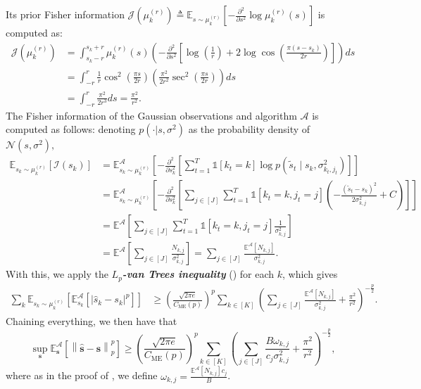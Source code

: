 \documentclass{article}
\def\vs{{\bm{s}}}
\def\gA{{\mathcal{A}}}
\def\gI{{\mathcal{I}}}
\def\gJ{{\mathcal{J}}}
\def\gN{{\mathcal{N}}}
\newcommand{\E}{\mathbb{E}}
\theoremstyle{plain}
\theoremstyle{definition}
\theoremstyle{plain}
\newcommand{\bignorm}[1]{\left\lVert #1 \right\rVert}
\newcommand{\indicator}{\mathds{1}}
\begin{document}
Its prior Fisher information $\gJ(\mu_k^{(r)}) \triangleq \E_{s \sim \mu_k^{(r)}}\left[ -\frac{\partial^2}{\partial s^2} \log \mu_k^{(r)}(s) \right]$ is computed as:
\begin{align}
    \gJ(\mu_k^{(r)}) &= \int_{s_k-r}^{s_k+r} \mu_k^{(r)}(s) \left( -\frac{\partial^2}{\partial s^2} \left[ \log\left(\frac{1}{r}\right) + 2 \log \cos\left(\frac{\pi (s - s_k)}{2r}\right) \right] \right) ds \\
    &= \int_{-r}^{r} \frac{1}{r} \cos^2\left(\frac{\pi s}{2 r}\right) \left( \frac{\pi^2}{2 r^2} \sec^2\left(\frac{\pi s}{2 r}\right) \right) ds \\
    &= \int_{-r}^{r} \frac{\pi^2}{2 r^3} ds = \frac{\pi^2}{r^2}.
\end{align}
The Fisher information of the Gaussian observations and algorithm $\gA$ is computed as follows: denoting $p(\cdot | s, \sigma^2)$ as the probability density of $\gN(s, \sigma^2),$
\begin{align}
    \E_{s_k \sim \mu_k^{(r)}}\left[ \gI(s_k) \right] &= \E_{s_k \sim \mu_k^{(r)}}^\gA \left[ -\frac{\partial^2}{\partial s_k^2} \left[ \sum_{t=1}^T \indicator[k_t = k] \log p(\tilde{s}_t \mid s_k, \sigma_{k_t,j_t}^2) \right] \right] \\
    &= \E_{s_k \sim \mu_k^{(r)}}^\gA \left[ -\frac{\partial^2}{\partial s_k^2} \left[ \sum_{j \in [J]} \sum_{t=1}^T \indicator[k_t = k, j_t = j] \left( -\frac{(\tilde{s}_t - s_k)^2}{2\sigma_{k,j}^2} + C \right) \right] \right] \\
    &= \E^\gA \left[ \sum_{j \in [J]} \sum_{t=1}^T \indicator[k_t = k, j_t = j] \frac{1}{\sigma_{k,j}^2} \right] \\
    &= \E^\gA \left[ \sum_{j \in [J]} \frac{N_{k,j}}{\sigma_{k,j}^2} \right]
    = \sum_{j \in [J]} \frac{\E^\gA[N_{k,j}]}{\sigma_{k,j}^2}.
\end{align}
With this, we apply the \textbf{\textit{$L_p$-van Trees inequality}} () for each $k$, which gives
\begin{align}
    \sum_k \E_{s_k \sim \mu_k^{(r)}}\left[ \E^\gA_{s_k}\left[ |\hat{s}_k - s_k|^p \right] \right]
    &\geq \left( \frac{\sqrt{2 \pi e}}{C_{\mathrm{ME}}(p)} \right)^p \sum_{k \in [K]} \left( \sum_{j \in [J]} \frac{\E^\gA[N_{k,j}]}{\sigma_{k,j}^2} + \frac{\pi^2}{r^2} \right)^{-\frac{p}{2}}.
\end{align}
Chaining everything, we then have that
\begin{equation}
    \sup_{\vs} \E^\gA_{\vs}\left[ \bignorm{\hat{\vs} - \vs}_p^p \right] \geq \left( \frac{\sqrt{2 \pi e}}{C_{\mathrm{ME}}(p)} \right)^p \sum_{k \in [K]} \left( \sum_{j \in [J]} \frac{B \omega_{k,j}}{c_j \sigma_{k,j}^2} + \frac{\pi^2}{r^2} \right)^{-\frac{p}{2}},
\end{equation}
where as in the proof of , we define $\omega_{k,j} = \frac{\E^\gA[N_{k,j}] c_j}{B}$.
\end{document}
